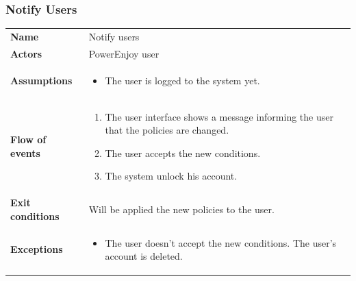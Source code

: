 \documentclass[english]{article}
\begin{document}
		\subsubsection{Notify Users}
		\begin{center}
		\begin{tabular}{l||p{10cm}}
		\textbf{Name} 
			& Notify users\\ [8px]
		\textbf{Actors} 
			& PowerEnjoy user\\ [8px]
		\textbf{Assumptions} 
			& \begin{itemize}
				\item The user is logged to the system yet.
			\end{itemize}\\
		\textbf{Flow of events}
			& \begin{enumerate}
	 			\item The user interface shows a message informing the user that the policies are changed.
				\item The user accepts the new conditions. 
				\item The system unlock his account.
			\end{enumerate}\\ 
		\textbf{Exit conditions}
			& Will be applied the new policies to the user.\\ [8px]
		\textbf{Exceptions}
			& \begin{itemize}
				\item The user doesn't accept the new conditions. The user's account is deleted.
			\end{itemize}
		\end{tabular}
		\end{center}
\end{document}
